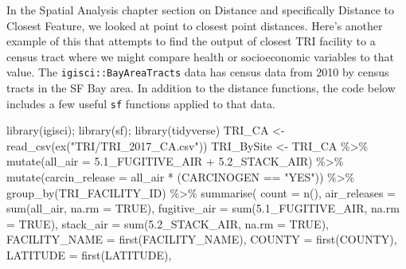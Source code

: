 \documentclass[
]{book}
\newenvironment{Shaded}{\begin{snugshade}}{\end{snugshade}}
\newcommand{\AttributeTok}[1]{\textcolor[rgb]{0.61,0.61,0.61}{#1}}
\newcommand{\ConstantTok}[1]{\textcolor[rgb]{0,0,0}{#1}}
\newcommand{\FunctionTok}[1]{\textcolor[rgb]{0,0,0}{#1}}
\newcommand{\NormalTok}[1]{#1}
\newcommand{\OtherTok}[1]{\textcolor[rgb]{0.37,0.37,0.37}{#1}}
\newcommand{\SpecialCharTok}[1]{\textcolor[rgb]{0,0,0}{#1}}
\newcommand{\StringTok}[1]{\textcolor[rgb]{0.5,0.5,0.5}{#1}}
\begin{document}
In the Spatial Analysis chapter section on Distance and specifically Distance to Closest Feature, we looked at point to closest point distances. Here's another example of this that attempts to find the output of closest TRI facility to a census tract where we might compare health or socioeconomic variables to that value. The \texttt{igisci::BayAreaTracts} data has census data from 2010 by census tracts in the SF Bay area. In addition to the distance functions, the code below includes a few useful \texttt{sf} functions applied to that data.

\begin{Shaded}
\begin{Highlighting}[]
\FunctionTok{library}\NormalTok{(igisci); }\FunctionTok{library}\NormalTok{(sf); }\FunctionTok{library}\NormalTok{(tidyverse)}
\NormalTok{TRI\_CA }\OtherTok{\textless{}{-}} \FunctionTok{read\_csv}\NormalTok{(}\FunctionTok{ex}\NormalTok{(}\StringTok{"TRI/TRI\_2017\_CA.csv"}\NormalTok{))}
\NormalTok{TRI\_BySite }\OtherTok{\textless{}{-}}\NormalTok{ TRI\_CA }\SpecialCharTok{\%\textgreater{}\%}
  \FunctionTok{mutate}\NormalTok{(}\AttributeTok{all\_air =} \StringTok{\textasciigrave{}}\AttributeTok{5.1\_FUGITIVE\_AIR}\StringTok{\textasciigrave{}} \SpecialCharTok{+} \StringTok{\textasciigrave{}}\AttributeTok{5.2\_STACK\_AIR}\StringTok{\textasciigrave{}}\NormalTok{) }\SpecialCharTok{\%\textgreater{}\%}
  \FunctionTok{mutate}\NormalTok{(}\AttributeTok{carcin\_release =}\NormalTok{ all\_air }\SpecialCharTok{*}\NormalTok{ (CARCINOGEN }\SpecialCharTok{==} \StringTok{"YES"}\NormalTok{)) }\SpecialCharTok{\%\textgreater{}\%}
  \FunctionTok{group\_by}\NormalTok{(TRI\_FACILITY\_ID) }\SpecialCharTok{\%\textgreater{}\%}
  \FunctionTok{summarise}\NormalTok{(}
    \AttributeTok{count =} \FunctionTok{n}\NormalTok{(),}
    \AttributeTok{air\_releases =} \FunctionTok{sum}\NormalTok{(all\_air, }\AttributeTok{na.rm =} \ConstantTok{TRUE}\NormalTok{),}
    \AttributeTok{fugitive\_air =} \FunctionTok{sum}\NormalTok{(}\StringTok{\textasciigrave{}}\AttributeTok{5.1\_FUGITIVE\_AIR}\StringTok{\textasciigrave{}}\NormalTok{, }\AttributeTok{na.rm =} \ConstantTok{TRUE}\NormalTok{),}
    \AttributeTok{stack\_air =} \FunctionTok{sum}\NormalTok{(}\StringTok{\textasciigrave{}}\AttributeTok{5.2\_STACK\_AIR}\StringTok{\textasciigrave{}}\NormalTok{, }\AttributeTok{na.rm =} \ConstantTok{TRUE}\NormalTok{),}
    \AttributeTok{FACILITY\_NAME =} \FunctionTok{first}\NormalTok{(FACILITY\_NAME),}
    \AttributeTok{COUNTY =} \FunctionTok{first}\NormalTok{(COUNTY),}
    \AttributeTok{LATITUDE =} \FunctionTok{first}\NormalTok{(LATITUDE),}

\end{Highlighting}
\end{Shaded}
\end{document}
